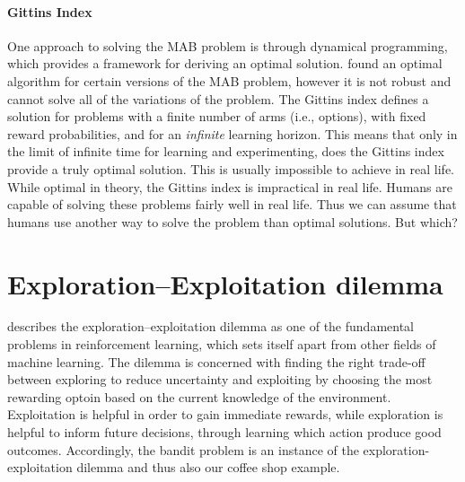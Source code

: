 \paragraph{Gittins Index}
One approach to solving the MAB problem is through dynamical programming, which provides a framework for deriving an optimal solution. %
\cite{gittins1979bandit} found an optimal algorithm for certain versions of the MAB problem, however it is not robust and cannot solve all of the variations of the problem. %
The Gittins \citeyear{gittins1979bandit} index defines a solution for problems with a finite number of arms (i.e., options), with fixed reward probabilities, and for an \textit{infinite} learning horizon. This means that only in the limit of infinite time for learning and experimenting, does the Gittins index provide a truly optimal solution. %
This is usually impossible to achieve in real life. %
While optimal in theory, the Gittins index is impractical in real life. 
Humans are capable of solving these problems fairly well in real life. Thus we can assume that humans use another way to solve the problem than optimal solutions. But which?   

\section{Exploration--Exploitation dilemma}
\cite{kaelbling1996reinforcement} describes the exploration--exploitation dilemma as one of the fundamental problems in reinforcement learning, which sets itself apart from other fields of machine learning. %
The dilemma is concerned with finding the right trade-off between exploring to reduce uncertainty and exploiting by choosing the most rewarding optoin based on the current knowledge of the environment. Exploitation is helpful in order to gain immediate rewards, while exploration is helpful to inform future decisions, through learning which action produce good outcomes. 
 Accordingly, the bandit problem is an instance of the exploration-exploitation dilemma and thus also our coffee shop example. 

